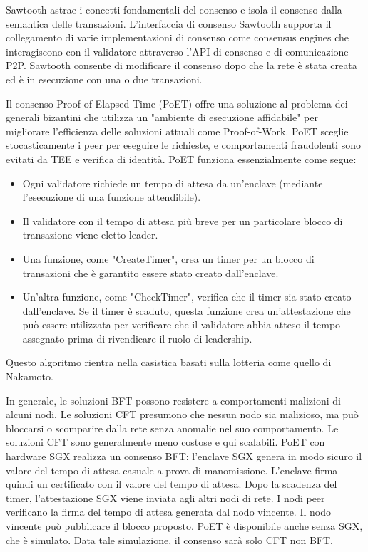 Sawtooth astrae i concetti fondamentali del consenso e isola il
consenso dalla semantica delle transazioni. L'interfaccia di consenso
Sawtooth supporta il collegamento di varie implementazioni di
consenso come consensus engines che interagiscono con il
validatore attraverso l'API di consenso e di comunicazione P2P.
Sawtooth consente di modificare il consenso dopo che la rete è stata
creata ed è in esecuzione con una o due transazioni.

Il consenso Proof of Elapsed Time (PoET)
offre una soluzione al problema dei generali
bizantini che utilizza un "ambiente di esecuzione affidabile" per migliorare l'efficienza
delle soluzioni attuali come Proof-of-Work.
PoET sceglie stocasticamente i peer
per eseguire le richieste, e comportamenti fraudolenti sono evitati
da TEE e verifica di
identità. PoET funziona essenzialmente come segue:
\begin{itemize}
    \item Ogni validatore richiede un tempo di attesa da un'enclave
(mediante l’esecuzione di una funzione attendibile).
    \item Il validatore con il tempo di attesa più breve per un particolare
blocco di transazione viene eletto leader.
    \item Una funzione, come "CreateTimer", crea un timer per un blocco
di transazioni che è garantito essere stato creato dall'enclave.
    \item Un'altra funzione, come "CheckTimer", verifica che il timer sia
stato creato dall'enclave. Se il timer è scaduto, questa funzione
crea un'attestazione che può essere utilizzata per verificare che il
validatore abbia atteso il tempo assegnato prima di rivendicare il
ruolo di leadership.
\end{itemize}
Questo algoritmo rientra nella casistica basati sulla lotteria come
quello di Nakamoto.

In generale, le soluzioni BFT possono resistere a comportamenti
malizioni di alcuni nodi. Le soluzioni CFT presumono che nessun
nodo sia malizioso, ma può bloccarsi o scomparire dalla rete senza
anomalie nel suo comportamento. Le soluzioni CFT sono
generalmente meno costose e qui scalabili. PoET con hardware SGX realizza un consenso BFT: l'enclave SGX
genera in modo sicuro il valore del tempo di attesa casuale a
prova di manomissione. L'enclave firma quindi un certificato con
il valore del tempo di attesa. Dopo la scadenza del timer,
l'attestazione SGX viene inviata agli altri nodi di rete. I nodi peer
verificano la firma del tempo di attesa generata dal nodo
vincente. Il nodo vincente può pubblicare il blocco proposto. PoET è disponibile anche senza SGX, che è simulato. Data tale
simulazione, il consenso sarà solo CFT non BFT.


